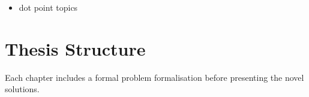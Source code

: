\begin{itemize}
    \item dot point topics
\end{itemize}



% 
%                                                                    
%                                                                    
%                                                                    
% 

\section{Thesis Structure}\label{sec:intro:structure}

Each chapter includes a formal problem formalisation before presenting the novel solutions.